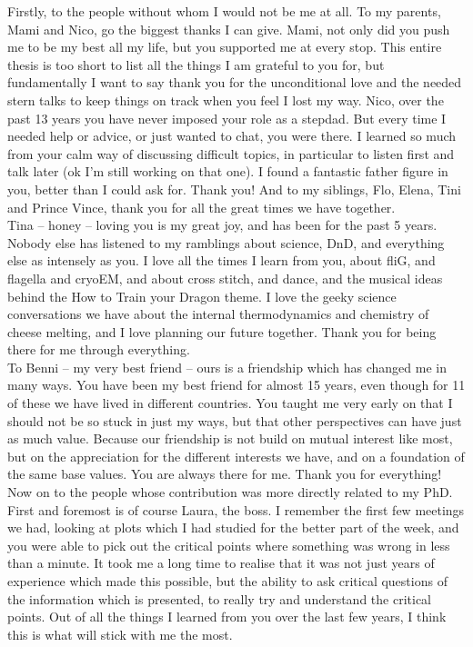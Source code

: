 Firstly, to the people without whom I would not be me at all. To my parents, Mami and Nico, go the biggest thanks I can give. Mami, not only did you push me to be my best all my life, but you supported me at every stop. This entire thesis is too short to list all the things I am grateful to you for, but fundamentally I want to say thank you for the unconditional love and the needed stern talks to keep things on track when you feel I lost my way. Nico, over the past 13 years you have never imposed your role as a stepdad. But every time I needed help or advice, or just wanted to chat, you were there. I learned so much from your calm way of discussing difficult topics, in particular to listen first and talk later (ok I'm still working on that one). I found a fantastic father figure in you, better than I could ask for. Thank you! And to my siblings, Flo, Elena, Tini and Prince Vince, thank you for all the great times we have together. \\

Tina -- honey -- loving you is my great joy, and has been for the past 5 years. Nobody else has listened to my ramblings about science, DnD, and everything else as intensely as you. I love all the times I learn from you, about fliG, and flagella and cryoEM, and about cross stitch, and dance, and the musical ideas behind the How to Train your Dragon theme. I love the geeky science conversations we have about the internal thermodynamics and chemistry of cheese melting, and I love planning our future together. Thank you for being there for me through everything. \\

To Benni -- my very best friend -- ours is a friendship which has changed me in many ways. You have been my best friend for almost 15 years, even though for 11 of these we have lived in different countries. You taught me very early on that I should not be so stuck in just my ways, but that other perspectives can have just as much value. Because our friendship is not build on mutual interest like most, but on the appreciation for the different interests we have, and on a foundation of the same base values. You are always there for me. Thank you for everything!\\

Now on to the people whose contribution was more directly related to my PhD. First and foremost is of course Laura, the boss. I remember the first few meetings we had, looking at plots which I had studied for the better part of the week, and you were able to pick out the critical points where something was wrong in less than a minute. It took me a long time to realise that it was not just years of experience which made this possible, but the ability to ask critical questions of the information which is presented, to really try and understand the critical points. Out of all the things I learned from you over the last few years, I think this is what will stick with me the most. \\

